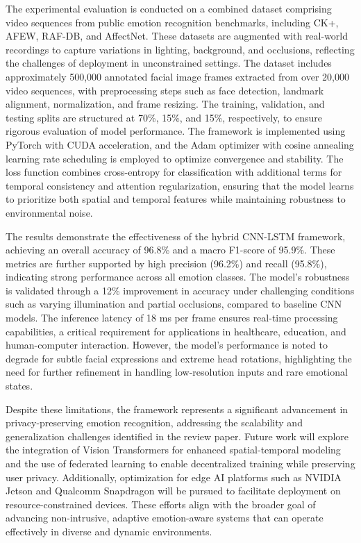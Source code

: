 \documentclass[conference]{IEEEtran}
\begin{document}
The experimental evaluation is conducted on a combined dataset comprising video sequences from public emotion recognition benchmarks, including CK+, AFEW, RAF-DB, and AffectNet. These datasets are augmented with real-world recordings to capture variations in lighting, background, and occlusions, reflecting the challenges of deployment in unconstrained settings. The dataset includes approximately 500,000 annotated facial image frames extracted from over 20,000 video sequences, with preprocessing steps such as face detection, landmark alignment, normalization, and frame resizing. The training, validation, and testing splits are structured at 70\%, 15\%, and 15\%, respectively, to ensure rigorous evaluation of model performance. The framework is implemented using PyTorch with CUDA acceleration, and the Adam optimizer with cosine annealing learning rate scheduling is employed to optimize convergence and stability. The loss function combines cross-entropy for classification with additional terms for temporal consistency and attention regularization, ensuring that the model learns to prioritize both spatial and temporal features while maintaining robustness to environmental noise.  

The results demonstrate the effectiveness of the hybrid CNN-LSTM framework, achieving an overall accuracy of 96.8\% and a macro F1-score of 95.9\%. These metrics are further supported by high precision (96.2\%) and recall (95.8\%), indicating strong performance across all emotion classes. The model's robustness is validated through a 12\% improvement in accuracy under challenging conditions such as varying illumination and partial occlusions, compared to baseline CNN models. The inference latency of 18 ms per frame ensures real-time processing capabilities, a critical requirement for applications in healthcare, education, and human-computer interaction. However, the model's performance is noted to degrade for subtle facial expressions and extreme head rotations, highlighting the need for further refinement in handling low-resolution inputs and rare emotional states.  

Despite these limitations, the framework represents a significant advancement in privacy-preserving emotion recognition, addressing the scalability and generalization challenges identified in the review paper. Future work will explore the integration of Vision Transformers for enhanced spatial-temporal modeling and the use of federated learning to enable decentralized training while preserving user privacy. Additionally, optimization for edge AI platforms such as NVIDIA Jetson and Qualcomm Snapdragon will be pursued to facilitate deployment on resource-constrained devices. These efforts align with the broader goal of advancing non-intrusive, adaptive emotion-aware systems that can operate effectively in diverse and dynamic environments.
\end{document}
